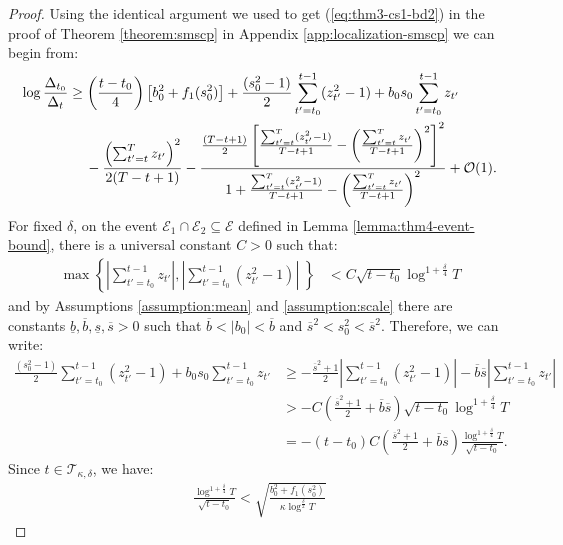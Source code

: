 \begin{proof}
Using the identical argument we used to get (\ref{eq:thm3-cs1-bd2}) in the proof of Theorem \ref{theorem:smscp} in Appendix \ref{app:localization-smscp} we can begin from:
\begin{align}
    \log \frac{\Delta_{t_0}}{\Delta_t} &\geq \left(\frac{t-t_0}{4}\right)\left[b_0^2 + f_1(s_0^2)\right]  + \frac{(s_0^2-1)}{2} \sum_{t' = t_0}^{t - 1} (z_{t'}^2-1) + b_0 s_0 \sum_{t' = t_0}^{t - 1} z_{t'} \notag \\
    &\quad\:  - \frac{\left(\sum_{t'=t}^T z_{t'}\right)^2}{2(T-t+1)} - \frac{\frac{(T-t+1)}{2}\left[\frac{\sum_{t'=t}^T (z_{t'}^2-1)}{T-t+1} - \left(\frac{\sum_{t'=t}^T z_{t'}}{T-t+1}\right)^2 \right]^2}{1 + \frac{\sum_{t'=t}^T (z_{t'}^2-1)}{T-t+1} - \left(\frac{\sum_{t'=t}^T z_{t'}}{T-t+1}\right)^2 } + \mathcal{O}(1). \label{eq:thm4-cs1-bd1}
\end{align}
For fixed $\delta$, on the event $\mathcal{E}_1\cap\mathcal{E}_2 \subseteq\mathcal{E}$ defined in Lemma \ref{lemma:thm4-event-bound}, there is a universal constant $C > 0$ such that:
\begin{align*}
    \max\left\{\left|\sum_{t' = t_0}^{t - 1} z_{t'}\right|,\left|\sum_{t' = t_0}^{t - 1} (z^2_{t'}-1)\right|\;\right\} &< C \sqrt{t-t_0}\log^{1 + \frac{\delta}{4}} T
\end{align*}
and by Assumptions \ref{assumption:mean} and \ref{assumption:scale} there are constants $\underline{b}, \overline{b},\underline{s}, \overline{s} > 0$ such that $\overline{b} < |b_0| < \overline{b}$ and $\overline{s}^2 < s_0^2 < \overline{s}^2$. Therefore, we can write:
\small
\begin{align*}
    \frac{(s_0^2-1)}{2} \sum_{t' = t_0}^{t - 1} (z_{t'}^2-1) + b_0 s_0 \sum_{t' = t_0}^{t - 1} z_{t'} &\geq  -\frac{\overline{s}^2+1}{2} \left|\sum_{t' = t_0}^{t - 1} (z_{t'}^2-1)\right| - \overline{b} \overline{s} \left|\sum_{t' = t_0}^{t - 1} z_{t'}\right| \\
    &> -C \left(\frac{\overline{s}^2+1}{2} + \overline{b} \overline{s}\right) \sqrt{t-t_0}\log^{1 + \frac{\delta}{4}} T \\
    &= -(t-t_0)C \left(\frac{\overline{s}^2+1}{2} + \overline{b} \overline{s}\right) \frac{\log^{1 + \frac{\delta}{4}} T}{\sqrt{t-t_0}}. 
\end{align*}
\normalsize
Since $t \in \mathcal{T}_{\kappa,\delta}$, we have: 
\begin{align*}
    \frac{\log^{1 + \frac{\delta}{4}} T}{\sqrt{t-t_0}} < \sqrt{\frac{b^2_0 + f_1(s_0^2)}{\kappa \log^{\frac{\delta}{2}}T}}
\end{align*}

\end{proof}

